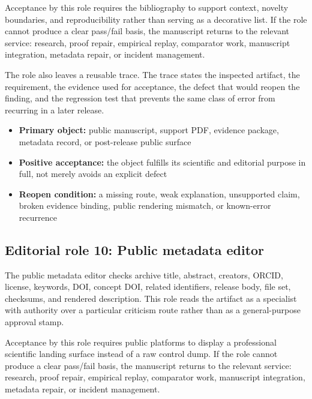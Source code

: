 Acceptance by this role requires the bibliography to support context, novelty boundaries, and reproducibility rather than serving as a decorative list. If the role cannot produce a clear pass/fail basis, the manuscript returns to the relevant service: research, proof repair, empirical replay, comparator work, manuscript integration, metadata repair, or incident management.


The role also leaves a reusable trace. The trace states the inspected artifact, the requirement, the evidence used for acceptance, the defect that would reopen the finding, and the regression test that prevents the same class of error from recurring in a later release.


\begin{itemize}[leftmargin=1.8em]

\item \textbf{Primary object:} public manuscript, support PDF, evidence package, metadata record, or post-release public surface

\item \textbf{Positive acceptance:} the object fulfills its scientific and editorial purpose in full, not merely avoids an explicit defect

\item \textbf{Reopen condition:} a missing route, weak explanation, unsupported claim, broken evidence binding, public rendering mismatch, or known-error recurrence

\end{itemize}

\subsection{Editorial role 10: Public metadata editor}

The public metadata editor checks archive title, abstract, creators, ORCID, license, keywords, DOI, concept DOI, related identifiers, release body, file set, checksums, and rendered description. This role reads the artifact as a specialist with authority over a particular criticism route rather than as a general-purpose approval stamp.


Acceptance by this role requires public platforms to display a professional scientific landing surface instead of a raw control dump. If the role cannot produce a clear pass/fail basis, the manuscript returns to the relevant service: research, proof repair, empirical replay, comparator work, manuscript integration, metadata repair, or incident management.


